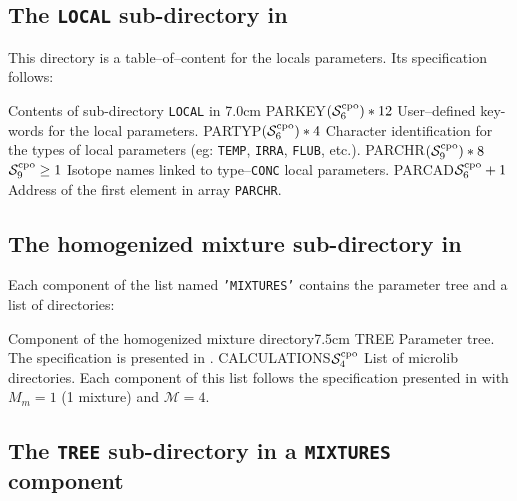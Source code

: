 \subsection{The {\tt LOCAL} sub-directory in }\label{sect:cpodirlocal}

This directory is a table--of--content for the locals parameters. Its
specification follows:

\begin{DescriptionEnregistrement}{Contents of sub-directory {\tt LOCAL} in
}{7.0cm}
\label{tabl:tabloc}
\CharEnr
  {PARKEY}{$(\mathcal{S}^{\rm cpo}_{6})*12$}
  {User--defined key-words for the local parameters.}
\CharEnr
  {PARTYP}{$(\mathcal{S}^{\rm cpo}_{6})*4$}
  {Character identification for the types of local parameters (eg: {\tt TEMP}, {\tt IRRA}, {\tt FLUB},
  etc.).}
\OptCharEnr
  {PARCHR}{$(\mathcal{S}^{\rm cpo}_{9})*8$}{$\mathcal{S}^{\rm cpo}_{9}\ge 1$}
  {Isotope names linked to type--{\tt CONC} local parameters.}
\IntEnr
  {PARCAD}{$\mathcal{S}^{\rm cpo}_{6}+1$}
  {Address of the first element in array {\tt PARCHR}.}
\end{DescriptionEnregistrement}

\subsection{The homogenized mixture sub-directory in }\label{sect:homo_mix}

Each component of the list named {\tt 'MIXTURES'} contains the parameter tree and a list of
directories:

\begin{DescriptionEnregistrement}{Component of the homogenized mixture directory}{7.5cm}
\label{tabl:mixture_cpo}
\DirEnr
  {TREE}
  {Parameter tree. The specification is presented in .}
\DirlEnr
  {CALCULATIONS}{$\mathcal{S}^{\rm cpo}_{4}$}
  {List of {\sc microlib} directories. Each component of this list follows the specification
   presented in  with $M_{m}=1$ (1 mixture) and $\mathcal{M}=4$.}
\end{DescriptionEnregistrement}

\subsection{The {\tt TREE} sub-directory in a {\tt MIXTURES} component}\label{sect:cpodirtree}

